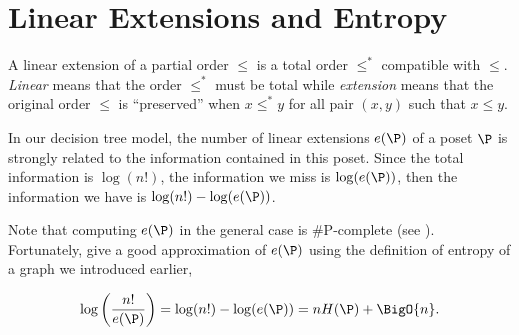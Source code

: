 \section{Linear Extensions and Entropy}

A linear extension of a partial order $\leq$ is a total order $\leq^*$
compatible with $\leq$. \emph{Linear} means that the order $\leq^*$ must be
total while \emph{extension} means that the original order $\leq$ is
``preserved'' \ie when \(x \leq^* y\) for all pair \((x,y)\) such that \(x
\leq y\).

In our decision tree model, the number of linear extensions $e(\P)$ of a poset
$\P$ is strongly related to the information contained in this poset. Since the
total information is $\log(n!)$, the information we miss is $\log(e(\P))$, then
the information we have is $\log(n!) - \log(e(\P))$.


Note that computing $e(\P)$ in the general case is \#P-complete
(see \citet*{brightwell1991counting}). Fortunately, \citet*{kahn:1995} give a good
approximation of $e(\P)$ using the definition of entropy of a graph we
introduced earlier,

\begin{equation}
\log\left(\frac{n!}{e(\P)}\right) = \log(n!) - \log(e(\P)) = n H(\P) +
\BigO{n}.
\label{eq:khankim1}
\end{equation}
